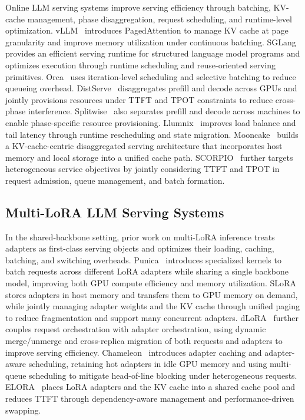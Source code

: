 \documentclass[lettersize,journal]{IEEEtran}
\begin{document}
Online LLM serving systems improve serving efficiency through batching, KV-cache management, phase disaggregation, request scheduling, and runtime-level optimization. vLLM~\cite{vLLM} introduces PagedAttention to manage KV cache at page granularity and improve memory utilization under continuous batching. SGLang~\cite{SGLang} provides an efficient serving runtime for structured language model programs and optimizes execution through runtime scheduling and reuse-oriented serving primitives. Orca~\cite{Orca} uses iteration-level scheduling and selective batching to reduce queueing overhead. DistServe~\cite{DistServe} disaggregates prefill and decode across GPUs and jointly provisions resources under TTFT and TPOT constraints to reduce cross-phase interference. Splitwise~\cite{Splitwise} also separates prefill and decode across machines to enable phase-specific resource provisioning. Llumnix~\cite{Llumnix} improves load balance and tail latency through runtime rescheduling and state migration. Mooncake~\cite{MooncakeFAST25} builds a KV-cache-centric disaggregated serving architecture that incorporates host memory and local storage into a unified cache path. SCORPIO~\cite{SCORPIO} further targets heterogeneous service objectives by jointly considering TTFT and TPOT in request admission, queue management, and batch formation.

\subsection{Multi-LoRA LLM Serving Systems}

In the shared-backbone setting, prior work on multi-LoRA inference treats adapters as first-class serving objects and optimizes their loading, caching, batching, and switching overheads. Punica~\cite{Punica} introduces specialized kernels to batch requests across different LoRA adapters while sharing a single backbone model, improving both GPU compute efficiency and memory utilization. SLoRA~\cite{SLoRA} stores adapters in host memory and transfers them to GPU memory on demand, while jointly managing adapter weights and the KV cache through unified paging to reduce fragmentation and support many concurrent adapters. dLoRA~\cite{dLoRA} further couples request orchestration with adapter orchestration, using dynamic merge/unmerge and cross-replica migration of both requests and adapters to improve serving efficiency. Chameleon~\cite{Chameleon} introduces adapter caching and adapter-aware scheduling, retaining hot adapters in idle GPU memory and using multi-queue scheduling to mitigate head-of-line blocking under heterogeneous requests. ELORA~\cite{FASTLIBRA} places LoRA adapters and the KV cache into a shared cache pool and reduces TTFT through dependency-aware management and performance-driven swapping.
\end{document}
